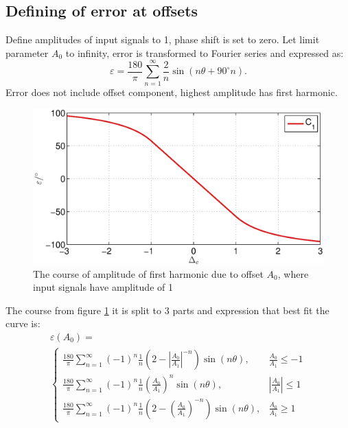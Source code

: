 \documentclass[a4paper]{article}
\begin{document}
\subsection{Defining of error at offsets}
Define amplitudes of input signals to 1, phase shift is set to zero. Let limit parameter $A_0$ to infinity, error is transformed to Fourier series and expressed as:
\begin{equation}
\label{equ:off_lim_vrsta}
\varepsilon = \frac{180}{\pi}\sum_{n=1}^{\infty}\frac{2}{n} \sin (n \theta+ 90^\circ n).
\end{equation}
Error does not include offset component, highest amplitude has first harmonic.
\begin{figure}[!htb]
	\begin{center}
		\includegraphics[width=\linewidth]{./Slike/off.eps}
		\caption{The course of amplitude of first harmonic due to offset  $A_0$, where input signals have amplitude of 1 } \label{fig:off}
	\end{center}
\end{figure}
The course from figure \ref{fig:off} it is split to 3 parts and expression that best fit the curve is:
\begin{multline}
\label{equ:offc_err}
\varepsilon(A_0)=\\
\begin{cases}
\frac{180}{\pi}\sum_{n=1}^{\infty}(-1)^n\frac{1}{n}(2-|\frac{A_0}{A_1}|^{-n}) \sin (n \theta ), & \frac{A_0}{A_1}\leq -1 \\
\frac{180}{\pi}\sum_{n=1}^{\infty}(-1)^n\frac{1}{n}(\frac{A_0}{A_1})^n \sin (n \theta ), & |\frac{A_0}{A_1}|\leq 1 \\
\frac{180}{\pi}\sum_{n=1}^{\infty}(-1)^n\frac{1}{n}(2-(\frac{A_0}{A_1})^{-n}) \sin (n \theta ), & \frac{A_0}{A_1}\geq 1
\end{cases}
\end{multline}
\end{document}

